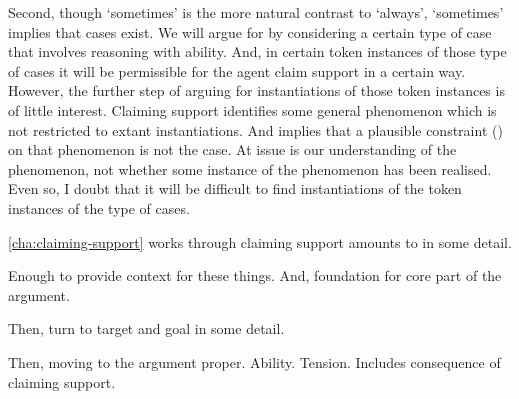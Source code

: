 \begin{note}
  Second, though `sometimes' is the more natural contrast to `always', `sometimes' implies that cases exist.
  We will argue for \EAS{} by considering a certain type of case that involves reasoning with ability.
  And, in certain token instances of those type of cases it will be permissible for the agent claim support in a certain way.
  However, the further step of arguing for instantiations of those token instances is of little interest.
  Claiming support identifies some general phenomenon which is not restricted to extant instantiations.
  And \EAS{} implies that a plausible constraint (\ESU{}) on that phenomenon is not the case.
  At issue is our understanding of the phenomenon, not whether some instance of the phenomenon has been realised.
  Even so, I doubt that it will be difficult to find instantiations of the token instances of the type of cases.
\end{note}

\begin{note}
  \autoref{cha:claiming-support} works through claiming support amounts to in some detail.

  Enough to provide context for these things.
  And, foundation for core part of the argument.

  Then, turn to target and goal in some detail.

  Then, moving to the argument proper.
  Ability.
  Tension.
  Includes consequence of claiming support.
\end{note}


